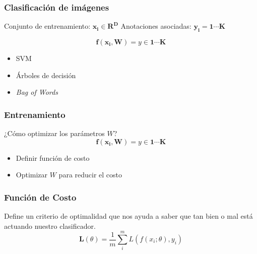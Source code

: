 \documentclass{beamer}
\begin{document}
\begin{frame}
\frametitle{Clasificación de imágenes}

Conjunto de entrenamiento: \(\boldsymbol{x_i} \in \boldsymbol{R^{D}}\)
Anotaciones asociadas: \(\boldsymbol{y_i = 1\cdots K}\)\vfill

\vfill

\begin{equation}
    \boldsymbol{f(x_i, W)} = y \in \boldsymbol{1 \cdots K}
\end{equation}\pause

\vfill

\begin{itemize}
    \item SVM 
    \item Árboles de decisión 
    \item \textit{Bag of Words}
\end{itemize}

\end{frame}




\begin{frame}
\frametitle{Entrenamiento}
¿Cómo optimizar los parámetros \(W\)?
\vfill
\begin{equation}
    \boldsymbol{f(x_i, W)} = y \in \boldsymbol{1 \cdots K}
\end{equation}\pause
\vfill
\begin{itemize}
    \item Definir función de costo
    \item Optimizar \(W\) para reducir el costo
\end{itemize}
\vfill
\end{frame}




\begin{frame}
\frametitle{Función de Costo}
Define un criterio de optimalidad que nos ayuda a
saber que tan bien o mal está actuando nuestro clasificador.
\vfill
\begin{equation}
\boldsymbol{L}(\theta) = \frac{1}{m} \sum^{m}_{i} L(f(x_i;\theta), y_i)
\end{equation}
\vfill
\end{frame}
\end{document}
